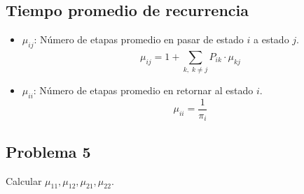 \documentclass{templateNote}
\begin{document}
\newpage
\subsection{Tiempo promedio de recurrencia}
\begin{itemize}
    \item $\mu_{ij}$: Número de etapas promedio en pasar de estado $i$ a estado $j$. 
    \begin{equation*}
        \mu_{ij} = 1 + \sum_{k, \; k \neq j}^{}{P_{ik} \cdot \mu_{kj}}
    \end{equation*}
    \item $\mu_{ii}$: Número de etapas promedio en retornar al estado $i$.
    \begin{equation*}
        \mu_{ii} = \frac{1}{\pi_i}
    \end{equation*}
\end{itemize}

\subsection{Problema 5}
Calcular $\mu_{11}, \mu_{12}, \mu_{21}, \mu_{22}$.
\newpage
\end{document}
